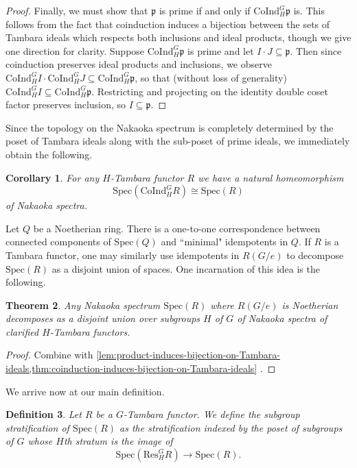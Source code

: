 \documentclass[11pt,dvipsnames]{amsart}
\newcommand{\p}{\mathfrak{p}}
\newtheorem{theorem}{Theorem}[section]
\newtheorem{corollary}[theorem]{Corollary}
\theoremstyle{BoldRemark}
\newtheorem{definition}[theorem]{Definition}
\newcommand{\Res}{\mathrm{Res}}
\newcommand{\Spec}{\mathrm{Spec}}
\newcommand{\Coind}{\mathrm{CoInd}}
\renewcommand{\subset}{\subseteq}
\begin{document}
\begin{proof}
	Finally, we must show that $\p$ is prime if and only if $\Coind_H^G \p$ is. This follows from the fact that coinduction induces a bijection between the sets of Tambara ideals which respects both inclusions and ideal products, though we give one direction for clarity. Suppose $\Coind_H^G \p$ is prime and let $I \cdot J \subset \p$. Then since coinduction preserves ideal products and inclusions, we observe $\Coind_H^G I \cdot \Coind_H^G J \subset \Coind_H^G \p$, so that (without loss of generality) $\Coind_H^G I \subset \Coind_H^G \p$. Restricting and projecting on the identity double coset factor preserves inclusion, so $I \subset \p$.
\end{proof}

Since the topology on the Nakaoka spectrum is completely determined by the poset of Tambara ideals along with the sub-poset of prime ideals, we immediately obtain the following.

\begin{corollary}\label{cor:coind-induces-Nakaoka-spec-homeo}
    For any $H$-Tambara functor $R$ we have a natural homeomorphism 
    \[ 
        \Spec(\Coind_H^G R) \cong \Spec(R) 
    \] 
    of Nakaoka spectra.
\end{corollary}

Let $Q$ be a Noetherian ring. There is a one-to-one correspondence between connected components of $\Spec(Q)$ and ``minimal" idempotents in $Q$. If $R$ is a Tambara functor, one may similarly use idempotents in $R(G/e)$ to decompose $\Spec(R)$ as a disjoint union of spaces. One incarnation of this idea is the following.

\begin{theorem}\label{thm:Nakaoka-spectrum-computation}
	Any Nakaoka spectrum $\mathrm{Spec}(R)$ where $R(G/e)$ is Noetherian decomposes as a disjoint union over subgroups $H$ of $G$ of Nakaoka spectra of clarified $H$-Tambara functors.
\end{theorem}

\begin{proof}
    Combine \cite[Theorem D]{Wis25a} with \cref{lem:product-induces-bijection-on-Tambara-ideals,thm:coinduction-induces-bijection-on-Tambara-ideals} .
\end{proof}

We arrive now at our main definition.

\begin{definition}
    Let $R$ be a $G$-Tambara functor. We define the \emph{subgroup stratification} of $\Spec(R)$ as the stratification indexed by the poset of subgroups of $G$ whose $H$th stratum is the image of 
    \[ 
        \Spec(\Res_H^G R) \rightarrow \Spec(R) .
    \] 
\end{definition}
\end{document}
